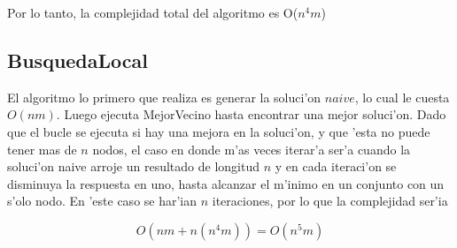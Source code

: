 Por lo tanto, la complejidad total del algoritmo es O($n^4m$)

\subsection{BusquedaLocal}
El algoritmo lo primero que realiza es generar la soluci'on $naive$, lo cual le cuesta $O(nm)$. Luego ejecuta MejorVecino hasta encontrar una mejor soluci'on. Dado que el bucle se ejecuta si hay una mejora en la soluci'on, y que 'esta no puede tener mas de $n$ nodos, el caso en donde m'as veces iterar'a ser'a cuando la soluci'on naive arroje un resultado de longitud $n$ y en cada iteraci'on se disminuya la respuesta en uno, hasta alcanzar el m'inimo en un conjunto con un s'olo nodo. En 'este caso se har'ian $n$ iteraciones, por lo que la complejidad ser'ia

$$O(nm + n(n^4m)) = O(n^5m)$$
